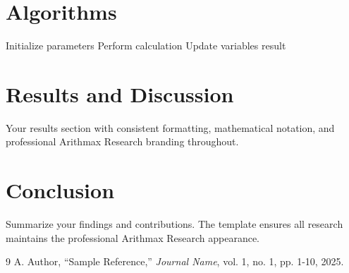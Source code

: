 \documentclass[twocolumn,ieee]{arithmaxresearch}
\begin{document}
\section{Algorithms}

\begin{algorithm}
\caption{Sample Algorithm with Arithmax Branding}
\begin{algorithmic}[1]
\STATE Initialize parameters
    \STATE Perform calculation
    \STATE Update variables
\ENDFOR
\RETURN result
\end{algorithmic}
\end{algorithm}

\section{Results and Discussion}

Your results section with consistent formatting, mathematical notation, and professional Arithmax Research branding throughout.

\section{Conclusion}

Summarize your findings and contributions. The template ensures all research maintains the professional Arithmax Research appearance.

\begin{thebibliography}{9}
A. Author, ``Sample Reference,'' \emph{Journal Name}, vol. 1, no. 1, pp. 1-10, 2025.
\end{thebibliography}
\end{document}
